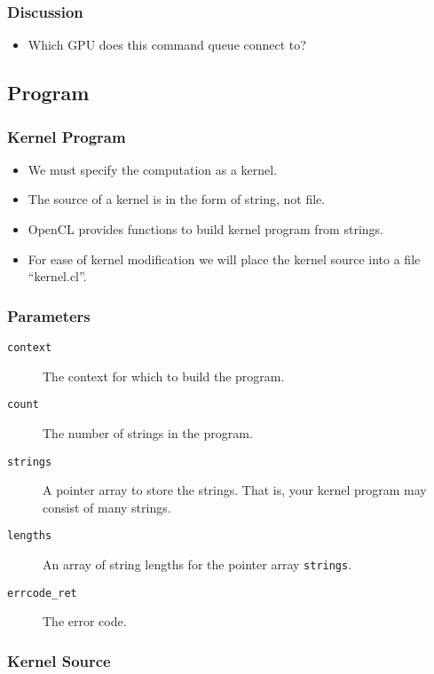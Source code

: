 \documentclass{beamer}
\begin{document}
\begin{frame}
  \frametitle{Discussion}
  \begin{itemize}
  \item Which GPU does this command queue connect to?
  \end{itemize}
\end{frame}

\subsection{Program}

\begin{frame}
  \frametitle{Kernel Program}
  \begin{itemize}
  \item We must specify the computation as a kernel.
  \item The source of a kernel is in the form of string, not file.
  \item OpenCL provides functions to build kernel program from strings.
  \item For ease of kernel modification we will place the kernel
    source into a file ``kernel.cl''.
  \end{itemize}
\end{frame}

\begin{frame}
\end{frame}

\begin{frame}
  \frametitle{Parameters}
  \begin{description}
  \item [\tt context] The context for which to build the program.
  \item [\tt count] The number of strings in the program.
  \item [\tt strings] A pointer array to store the strings.  That is,
    your kernel program may consist of many strings.
  \item [\tt lengths] An array of string lengths for the pointer array
    {\tt strings}.
  \item [\tt errcode\_ret] The error code.
  \end{description}
\end{frame}

\begin{frame}
  \frametitle{Kernel Source}
\end{frame}
\end{document}
